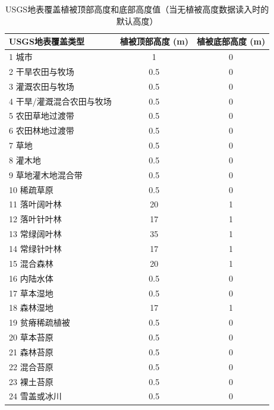 \begin{table}[htbp]
    \centering
    \caption[USGS地表覆盖植被顶部高度和底部高度值]{USGS地表覆盖植被顶部高度和底部高度值（当无植被高度数据读入时的默认高度）}
    \label{tab:USGS地表覆盖植被顶部高度和底部高度值}
    \begin{tabular}{@{}lcc@{}}
    \toprule
    USGS地表覆盖类型     & 植被顶部高度 (m) & 植被底部高度 (m) \\ \midrule
    1 城市           & 1          & 0          \\
    2 干旱农田与牧场      & 0.5        & 0          \\
    3 灌溉农田与牧场      & 0.5        & 0          \\
    4 干旱/灌溉混合农田与牧场 & 0.5        & 0          \\
    5 农田草地过渡带      & 0.5        & 0          \\
    6 农田林地过渡带      & 0.5        & 0          \\
    7 草地           & 0.5        & 0          \\
    8 灌木地          & 0.5        & 0          \\
    9 草地灌木地混合带     & 0.5        & 0          \\
    10 稀疏草原        & 0.5        & 0          \\
    11 落叶阔叶林       & 20         & 1          \\
    12 落叶针叶林       & 17         & 1          \\
    13 常绿阔叶林       & 35         & 1          \\
    14 常绿针叶林       & 17         & 1          \\
    15 混合森林        & 20         & 1          \\
    16 内陆水体        & 0.5        & 0          \\
    17 草本湿地        & 0.5        & 0          \\
    18 森林湿地        & 17         & 1          \\
    19 贫瘠稀疏植被      & 0.5        & 0          \\
    20 草本苔原        & 0.5        & 0          \\
    21 森林苔原        & 0.5        & 0          \\
    22 混合苔原        & 0.5        & 0          \\
    23 裸土苔原        & 0.5        & 0          \\
    24 雪盖或冰川       & 0.5        & 0          \\ \bottomrule
    \end{tabular}
\end{table}

